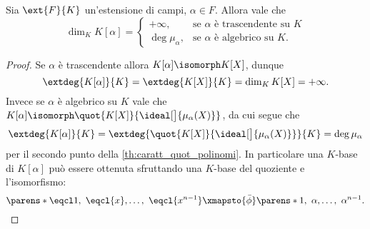 \begin{proposition}
    Sia $\ext{F}{K}$ un'estensione di campi, $\alpha \in F$. Allora vale che \[
        \dim_K K[\alpha] = \begin{cases}
            +\infty, &\text{se $\alpha$ è trascendente su $K$}\\
            \deg \mu_\alpha, &\text{se $\alpha$ è algebrico su $K$.}
        \end{cases}    
    \]
\end{proposition}
\begin{proof}
    Se $\alpha$ è trascendente allora $K[\alpha] \isomorph K[X]$, dunque \[
        \extdeg{K[\alpha]}{K} = \extdeg{K[X]}{K} = \dim_K K[X] = +\infty.
    \] Invece se $\alpha$ è algebrico su $K$ vale che $K[\alpha] \isomorph \quot{K[X]}{\ideal[\big]{\mu_\alpha(X)}}$, da cui segue che \[
        \extdeg{K[\alpha]}{K} = \extdeg{\quot{K[X]}{\ideal[\big]{\mu_\alpha(X)}}}{K} = \deg \mu_\alpha
    \] per il secondo punto della \autoref{th:caratt_quot_polinomi}. In particolare una $K$-base di $K[\alpha]$ può essere ottenuta sfruttando una $K$-base del quoziente e l'isomorfismo: \[
        \parens*{\eqcl 1,\ \eqcl{x}, \dots,\ \eqcl{x^{n-1}}} \xmapsto{\bar\phi} \parens*{1,\ \alpha, \dots,\ \alpha^{n-1}}.    
    \]
\end{proof}